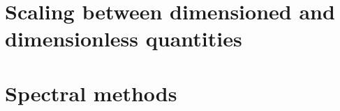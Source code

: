 \section{Scaling between dimensioned and dimensionless quantities}  %
\newpage %
\section{Spectral methods} 

